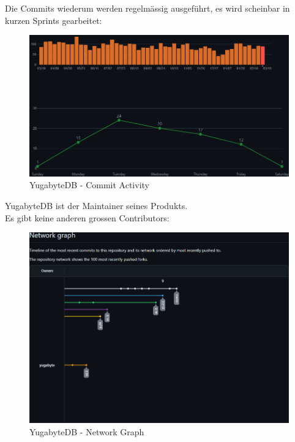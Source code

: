 \begin{flushleft}
    Die Commits wiederum werden regelmässig ausgeführt, es wird scheinbar in kurzen Sprints gearbeitet:
    \begin{figure}[H]
        \centering
        \includegraphics[width=0.75\linewidth]{source/implementation/evaluation/postgresql_ha_solutions/insights/yugabytedb/commit_activity_yugabyte_yugabyte-db}
        \caption{YugabyteDB - Commit Activity}
        \label{fig:commit_activity_yugabyte_yugabyte-db}
    \end{figure}
    YugabyteDB ist der Maintainer seines Produkts.\\
    Es gibt keine anderen grossen Contributors:
     \begin{figure}[H]
        \centering
        \includegraphics[width=0.75\linewidth]{source/implementation/evaluation/postgresql_ha_solutions/insights/yugabytedb/network_graph_yugabyte_yugabyte-db}
        \caption{YugabyteDB - Network Graph}
        \label{fig:network_graph_yugabyte_yugabyte-db}
    \end{figure}
\end{flushleft}